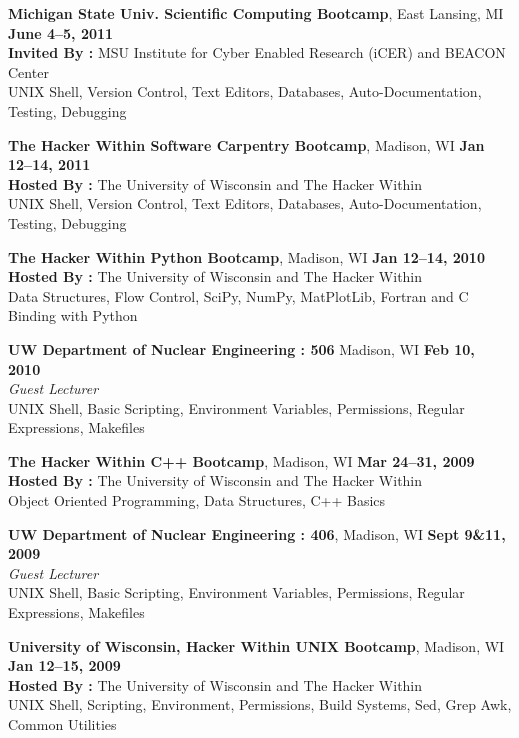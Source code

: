 \documentclass[margin,line]{resume}
\begin{document}
\begin{resume}
    \textbf{Michigan State Univ. Scientific Computing Bootcamp}, East Lansing, MI \hfill \textbf{June 4--5, 2011}\\
               \textbf{Invited By : } MSU Institute for Cyber Enabled Research (iCER) and BEACON Center\\
               UNIX Shell, Version Control, Text Editors, Databases, Auto-Documentation, Testing, Debugging

    \textbf{The Hacker Within Software Carpentry Bootcamp}, Madison, WI \hfill\textbf{Jan 12--14, 2011}\\
               \textbf{Hosted By : } The University of Wisconsin and The Hacker Within\\
               UNIX Shell, Version Control, Text Editors, Databases, Auto-Documentation, Testing, Debugging

    \textbf{The Hacker Within Python Bootcamp}, Madison, WI \hfill \textbf{Jan 12--14, 2010}\\
               \textbf{Hosted By : } The University of Wisconsin and The Hacker Within\\
               Data Structures, Flow Control, SciPy, NumPy, MatPlotLib, Fortran and C Binding with Python

    \textbf{UW Department of Nuclear Engineering : 506} Madison, WI \hfill \textbf{Feb 10, 2010}\\ 
               \textsl{Guest Lecturer}\\
               UNIX Shell, Basic Scripting, Environment Variables, Permissions, 
               Regular Expressions, Makefiles 

    \textbf{The Hacker Within C++ Bootcamp}, Madison, WI \hfill \textbf{Mar 24--31, 2009}\\
               \textbf{Hosted By : } The University of Wisconsin and The Hacker Within\\
               Object Oriented Programming, Data Structures, C++ Basics

    \textbf{UW Department of Nuclear Engineering : 406}, Madison, WI \hfill \textbf{Sept 9\&11, 2009}\\ 
               \textsl{Guest Lecturer}\\
               UNIX Shell, Basic Scripting, Environment Variables, Permissions, Regular Expressions, Makefiles 

    \textbf{University of Wisconsin, Hacker Within UNIX Bootcamp}, Madison, WI \hfill \textbf{Jan 12--15, 2009}\\
               \textbf{Hosted By : } The University of Wisconsin and The Hacker Within\\
               UNIX Shell, Scripting, Environment, Permissions, Build Systems, Sed, Grep Awk, Common Utilities
    \pagebreak

\end{resume}
\end{document}
